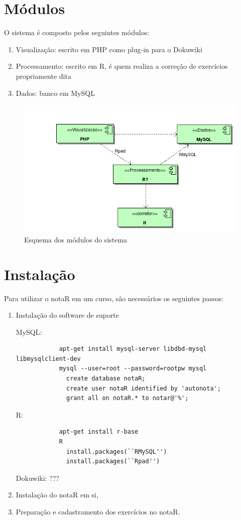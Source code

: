 \documentclass[12pt,a4paper]{article}
\begin{document}
\section{M\'odulos}
O sistema \'e composto pelos seguintes m\'odulos:
\begin{enumerate}
	\item Visualiza\c c\~ao: escrito em PHP como plug-in para o Dokuwiki
	\item Processamento: escrito em R, \'e quem realiza a corre\c c\~ao de
			exerc\'icios propriamente dita
	\item Dados: banco em MySQL
\end{enumerate}

\begin{figure}[htpb]
		\begin{center}
				\includegraphics[scale=0.50]{model/modulos.png}
		\end{center}
		\caption{Esquema dos m\'odulos do sistema}
		\label{fig:modulos}
\end{figure}
\section{Instala\c c\~ao}
Para utilizar o notaR em um curso, s\~ao necess\'arios os seguintes passos:
\begin{enumerate}
	\item Instala\c c\~ao do software de suporte

			MySQL:
			\begin{verbatim}
			apt-get install mysql-server libdbd-mysql libmysqlclient-dev
			mysql --user=root --password=rootpw mysql
			  create database notaR;
			  create user notaR identified by 'autonota';
			  grant all on notaR.* to notar@'%';
			\end{verbatim}
			R:
			\begin{verbatim}
			apt-get install r-base
			R
			  install.packages(``RMySQL'')
			  install.packages(``Rpad'')
			\end{verbatim}
			Dokuwiki:
			???
	\item Instala\c c\~ao do notaR em si,
	\item Prepara\c c\~ao e cadastramento dos exerc\'icios no notaR.
\end{enumerate}
\end{document}
